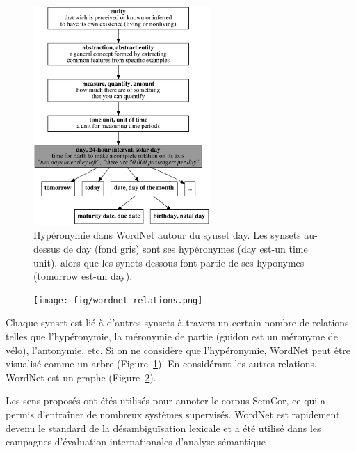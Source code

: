 \begin{figure}[ht]
    \centering
    \includegraphics[width=0.6\textwidth]{fig/wordnet_hypernymy.png}
    \caption{\label{fig:wordnet_hypernymy}Hypéronymie dans WordNet autour du
synset day. Les synsets au-dessus de day (fond gris) sont ses hypéronymes (day
est-un time unit), alors que les synets dessous font partie de ses hyponymes
(tomorrow est-un day).}
\end{figure}

\begin{figure}[ht]
    \centering
    \texttt{[image: fig/wordnet\_relations.png]}
    \caption{\label{fig:wordnet_relations}}
\end{figure}


Chaque synset est lié à d'autres synsets à travers un certain nombre de
relations telles que l'hypéronymie, la méronymie de partie (guidon est un
méronyme de vélo), l'antonymie, etc. Si on ne considère que l'hypéronymie,
WordNet peut être visualisé comme un arbre
(Figure~\ref{fig:wordnet_hypernymy}). En considérant les autres relations,
WordNet est un graphe (Figure~\ref{fig:wordnet_relations}).


Les sens proposés ont étés utilisés pour annoter le corpus SemCor, ce qui a
permis d'entraîner de nombreux systèmes supervisés. WordNet est rapidement
devenu le standard de la désambiguïsation lexicale et a été utilisé dans les
campagnes d'évaluation internationales d'analyse sémantique
\citep{navigli2009word}.


